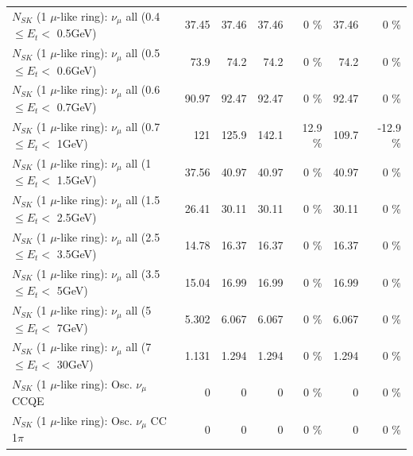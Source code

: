 \begin{table}
\begin{tabular}{| l | r | r | r  r | r  r |}
       $N_{SK}$ (1 $\mu$-like ring): $\nu_{\mu}$ all (0.4 $\leq E_{t} <$ 0.5GeV) &           37.45 &           37.46 &           37.46 &        0 \%  &           37.46 &        0 \%  \\ 
       $N_{SK}$ (1 $\mu$-like ring): $\nu_{\mu}$ all (0.5 $\leq E_{t} <$ 0.6GeV) &            73.9 &            74.2 &            74.2 &        0 \%  &            74.2 &        0 \%  \\ 
       $N_{SK}$ (1 $\mu$-like ring): $\nu_{\mu}$ all (0.6 $\leq E_{t} <$ 0.7GeV) &           90.97 &           92.47 &           92.47 &        0 \%  &           92.47 &        0 \%  \\ 
         $N_{SK}$ (1 $\mu$-like ring): $\nu_{\mu}$ all (0.7 $\leq E_{t} <$ 1GeV) &             121 &           125.9 &           142.1 &     12.9 \%  &           109.7 &    -12.9 \%  \\ 
         $N_{SK}$ (1 $\mu$-like ring): $\nu_{\mu}$ all (1 $\leq E_{t} <$ 1.5GeV) &           37.56 &           40.97 &           40.97 &        0 \%  &           40.97 &        0 \%  \\ 
       $N_{SK}$ (1 $\mu$-like ring): $\nu_{\mu}$ all (1.5 $\leq E_{t} <$ 2.5GeV) &           26.41 &           30.11 &           30.11 &        0 \%  &           30.11 &        0 \%  \\ 
       $N_{SK}$ (1 $\mu$-like ring): $\nu_{\mu}$ all (2.5 $\leq E_{t} <$ 3.5GeV) &           14.78 &           16.37 &           16.37 &        0 \%  &           16.37 &        0 \%  \\ 
         $N_{SK}$ (1 $\mu$-like ring): $\nu_{\mu}$ all (3.5 $\leq E_{t} <$ 5GeV) &           15.04 &           16.99 &           16.99 &        0 \%  &           16.99 &        0 \%  \\ 
           $N_{SK}$ (1 $\mu$-like ring): $\nu_{\mu}$ all (5 $\leq E_{t} <$ 7GeV) &           5.302 &           6.067 &           6.067 &        0 \%  &           6.067 &        0 \%  \\ 
          $N_{SK}$ (1 $\mu$-like ring): $\nu_{\mu}$ all (7 $\leq E_{t} <$ 30GeV) &           1.131 &           1.294 &           1.294 &        0 \%  &           1.294 &        0 \%  \\ 
\hline
\hline
                               $N_{SK}$ (1 $\mu$-like ring): Osc. $\nu_\mu$ CCQE &               0 &               0 &               0 &        0 \%  &               0 &        0 \%  \\ 
                          $N_{SK}$ (1 $\mu$-like ring): Osc. $\nu_\mu$ CC 1$\pi$ &               0 &               0 &               0 &        0 \%  &               0 &        0 \%  \\ 

\end{tabular}
\end{table}
